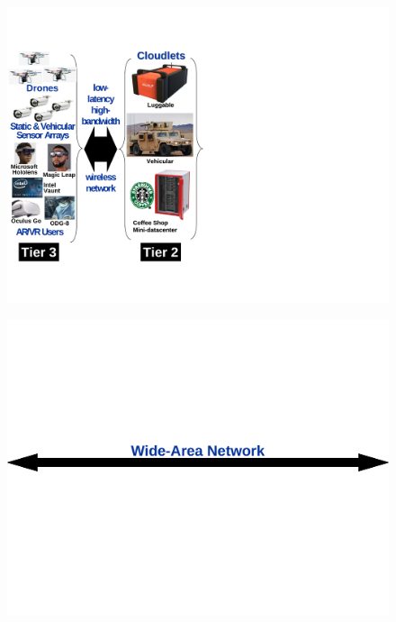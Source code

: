 \begin{figure}
\begin{minipage}[b]{4.3in}
\begin{minipage}[c]{1.68in}
\includegraphics[scale=0.3]{FIGS/fig-3tier-A.pdf}
\end{minipage}
\begin{minipage}[c]{1.75in}
\vspace{0.01in}
\includegraphics[scale=0.16]{FIGS/fig-3tier-B-cropped.pdf}\\
\end{minipage}
\begin{minipage}[c]{0.55in}

\end{minipage}
\end{minipage}
\end{figure}
